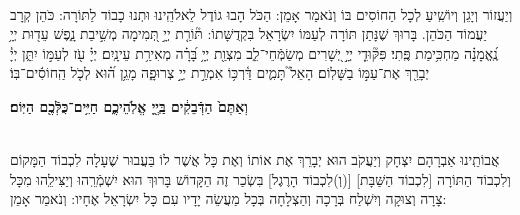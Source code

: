 \documentclass[twoside, openany, parskip=half, 11pt]{book}
\begin{document}
\avharachamim

\\
וְיַעֲזוֹר וְיָגֵן וְיוֹשִֽׁיעַ לְכָל הַחוֹסִים בּוֹ וְנֹאמַר אָמֵן:
 הַכֹּל הָבוּ גוֹדֶל לֵאלֹהֵֽינוּ וּתְנוּ כָבוֹד לַתּוֹרָה: כֹּהֵן קְרָב יַעֲמוֹד 
 הַכֹּהֵן. בָּרוּךְ שֶׁנָּתַן תּוֹרָה לְעַמּוֹ יִשְׂרָאֵל בִּקְדֻשָּׁתוֹ:
 תּ֘וֹרַ֤ת יְיָ֣ תְּ֭מִימָה מְשִׁ֣יבַת נָ֑פֶשׁ עֵד֖וּת יְיָ֥ נֶֽ֝אֱמָנָ֗ה מַחְכִּ֥ימַת פֶּֽתִי׃ פִּקּ֘וּדֵ֤י יְיָ֣ יְ֭שָׁרִים מְשַׂמְּֿחֵי־לֵ֑ב מִצְוַ֖ת יְיָ֥ בָּ֝רָ֗ה מְאִירַ֥ת עֵינָֽיִם׃
 יְיָ֗ עֹ֖ז לְעַמּ֣וֹ יִתֵּ֑ן יְיָ֓ יְבָרֵ֖ךְ אֶת־עַמּ֣וֹ בַשָּׁלֽוֹם׃ 
 הָאֵל֮ תָּמִ֢ים דַּ֫רְכּ֥וֹ אִמְרַ֣ת יְיָ֣ צְרוּפָ֑ה מָגֵ֥ן ה֝֗וּא לְכֹ֤ל הַֽחוֹסִ֬ים־בּֽוֹ׃


\textbf{וְאַתֶּם֙ הַדְּֿבֵקִ֔ים בַּֽיְ֖יָ אֱלֹֽהֵיכֶ֑ם חַיִּ֥ים־כֻּלְּֿכֶ֖ם הַיּֽוֹם׃} 

\clearpage

\torahbarachu 

\hagomel

\\
 אֲבוֹתֵֽינוּ אַבְרָהָם יִצְחָק וְיַעֲקֹב הוּא יְבָרֵךְ אֶת 
 אוֹתוֹ וְאֶת כָּל אֲשֶׁר לוֹ 
בַּעֲבוּר שֶׁעָלָה לִכְבוֹד הַמָּקוֹם וְלִכְבוֹד הַתּוֹרָה 
[לִכְבוֹד הַשַּׁבָּת]
[(וְ)לִכְבוֹד הָרֶגֶל]
 בִּשְׂכַר זֶה הַקָּדוֹשׁ בָּרוּךְ הוּא יִשְׁמְֿרֵֽהוּ וְיַצִּילֵֽהוּ מִכָּל צָרָה וְצוּקָה וְיִשְׁלַח בְּרָכָה וְהַצְלָחָה בְּכָל מַעֲשֵׂה יָדָיו עִם כָּל יִשְׂרָאֵל אֶחָיו: וְנֹאמַר אָמֵן:
\end{document}
